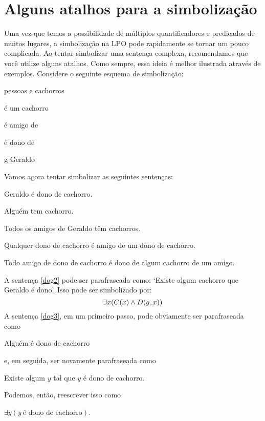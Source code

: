 \section{Alguns atalhos para a simbolização}
Uma vez que temos a possibilidade de múltiplos quantificadores e predicados de muitos lugares, a simbolização na LPO pode rapidamente se tornar um pouco complicada.
Ao tentar simbolizar uma sentença complexa, recomendamos que você utilize alguns atalhos.
Como sempre, essa ideia é melhor ilustrada através de exemplos.
Considere o seguinte esquema de simbolização:
\begin{center}
\begin{ekey}
\item[\text{domínio}] pessoas e cachorros
\item[\atom{C}{x}]  é um cachorro
\item[\atom{A}{x,y}]  é amigo de 
\item[\atom{D}{x,y}]  é dono de 
\item[g] Geraldo
\end{ekey}
\end{center}
Vamos agora tentar simbolizar as seguintes sentenças:
\begin{earg}
\item[\ex{dog2}] Geraldo é dono de cachorro.
\item[\ex{dog3}] Alguém tem cachorro.
\item[\ex{dog4}] Todos os amigos de Geraldo têm cachorros.
\item[\ex{dog5}] Qualquer dono de cachorro é amigo de um dono de cachorro.
\item[\ex{dog6}] Todo amigo de dono de cachorro é dono de algum cachorro de um amigo.
\end{earg}
A sentença \ref{dog2} pode ser parafraseada como: `Existe algum cachorro que Geraldo é dono'.
Isso pode ser simbolizado por:
$$\exists x(\mathord{C}(x) \wedge \mathord{D}(g,x))$$
A sentença \ref{dog3}, em um primeiro passo, pode obviamente ser parafraseada como
\begin{center}
	Alguém é dono de cachorro
\end{center}
e, em seguida, ser novamente parafraseada como
\begin{center}
	Existe algum $y$ tal que $y$ é dono de cachorro.
\end{center}
Podemos, então, reescrever isso como
\begin{center}
	$\exists y(y\ \text{é dono de cachorro})$.
\end{center}
